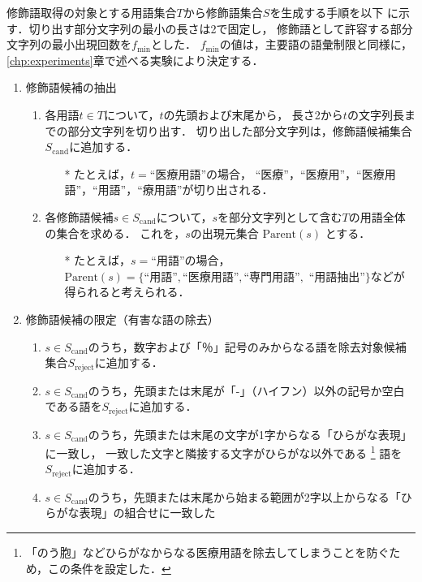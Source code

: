 \documentclass[japanese]{jnlp_1.4}
\begin{document}
修飾語取得の対象とする用語集合$T$から修飾語集合$S$を生成する手順を以下
に示す．切り出す部分文字列の最小の長さは2で固定し，
修飾語として許容する部分文字列の最小出現回数を$f_\mathrm{min}$とした．
$f_\mathrm{min}$の値は，主要語の語彙制限と同様に，
\ref{chp:experiments}章で述べる実験により決定する．
\begin{enumerate}
 \item 修飾語候補の抽出
       \begin{enumerate}
	\item 各用語$t \in T$について，$t$の先頭および末尾から，
	      長さ2から$t$の文字列長までの部分文字列を切り出す．
	      切り出した部分文字列は，修飾語候補集合$S_\mathrm{cand}$に追加する．
	      \begin{itemize}
	       \item[*] たとえば，$t=\mbox{``医療用語''}$の場合，
		     ``医療''，``医療用''，``医療用語''，``用語''，``療用語''が切り出される．
	      \end{itemize}
	\item 各修飾語候補$s \in S_\mathrm{cand}$について，$s$を部分文字列として含む$T$の用語全体の集合を求める．
	      これを，$s$の出現元集合 $\mathrm{Parent}(s)$ とする．
	      \begin{itemize}
	       \item[*] たとえば，$s=\text{``用語''}$の場合，
		     $\mathrm{Parent}(s)=\{\text{``用語''},\text{``医療用語''},\text{``専門用語''},$
		     $\text{``用語抽出''}\}$などが得られると考えられる．
	      \end{itemize}
       \end{enumerate}
 \item 修飾語候補の限定（有害な語の除去）
       \begin{enumerate}
	\item $s \in S_\mathrm{cand}$のうち，数字および「％」記号のみからなる語を除去対象候補集合$S_\mathrm{reject}$に追加する．
	\item $s \in S_\mathrm{cand}$のうち，先頭または末尾が「-」（ハイフン）以外の記号か空白である語を$S_\mathrm{reject}$に追加する．
	\item $s \in S_\mathrm{cand}$のうち，先頭または末尾の文字が1字からなる「ひらがな表現」に一致し，
	      一致した文字と隣接する文字がひらがな以外である
	      \footnote{「のう胞」などひらがなからなる医療用語を除去してしまうことを防ぐため，この条件を設定した．}
	      語を$S_\mathrm{reject}$に追加する．
	\item $s \in S_\mathrm{cand}$のうち，先頭または末尾から始まる範囲が2字以上からなる「ひらがな表現」の組合せに一致した

\end{enumerate}
\end{enumerate}
\end{document}
